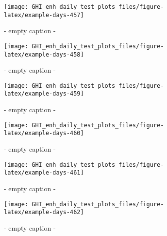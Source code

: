 \documentclass[
  10pt,
  a4paper,oneside]{article}
\begin{document}
\begin{figure}[H]

{\centering \texttt{[image: GHI\_enh\_daily\_test\_plots\_files/figure-latex/example-days-457]} 

}

\caption{ - empty caption - }\label{fig:example-days-457}
\end{figure}

\begin{figure}[H]

{\centering \texttt{[image: GHI\_enh\_daily\_test\_plots\_files/figure-latex/example-days-458]} 

}

\caption{ - empty caption - }\label{fig:example-days-458}
\end{figure}

\begin{figure}[H]

{\centering \texttt{[image: GHI\_enh\_daily\_test\_plots\_files/figure-latex/example-days-459]} 

}

\caption{ - empty caption - }\label{fig:example-days-459}
\end{figure}

\begin{figure}[H]

{\centering \texttt{[image: GHI\_enh\_daily\_test\_plots\_files/figure-latex/example-days-460]} 

}

\caption{ - empty caption - }\label{fig:example-days-460}
\end{figure}

\begin{figure}[H]

{\centering \texttt{[image: GHI\_enh\_daily\_test\_plots\_files/figure-latex/example-days-461]} 

}

\caption{ - empty caption - }\label{fig:example-days-461}
\end{figure}

\begin{figure}[H]

{\centering \texttt{[image: GHI\_enh\_daily\_test\_plots\_files/figure-latex/example-days-462]} 

}

\caption{ - empty caption - }\label{fig:example-days-462}
\end{figure}
\end{document}
